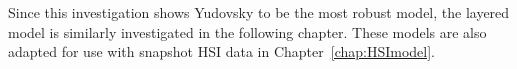 Since this investigation shows Yudovsky to be the most robust model, the layered model is similarly investigated in the following chapter. These models are also adapted for use with snapshot HSI data in Chapter~\ref{chap:HSImodel}. 





% 

% 

